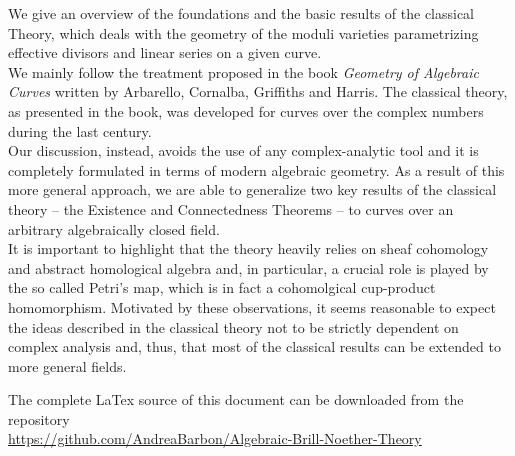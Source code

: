 


\begin{abstracts}         %

	We give an overview of the foundations and the basic results of the classical \BN Theory, which deals with the geometry of the moduli varieties parametrizing effective divisors and linear series on a given curve.\\
	We mainly follow the treatment proposed in the book \emph{Geometry of Algebraic Curves} written by Arbarello, Cornalba, Griffiths and Harris. 
	The classical theory, as presented in the book, was developed for curves over the complex numbers during the last century.\\ 
	Our discussion, instead, avoids the use of any complex-analytic tool and it is completely formulated in terms of modern algebraic geometry. As a result of this more general approach, we are able to generalize two key results of the classical theory -- the Existence and Connectedness Theorems -- to curves over an arbitrary algebraically closed field.\\
	It is important to highlight that the \BN theory heavily relies on sheaf cohomology and abstract homological algebra and, in particular, a crucial role is played by the so called Petri's map, which is in fact a cohomolgical cup-product homomorphism. Motivated by these observations, it seems reasonable to expect the ideas described in the classical theory not to be strictly dependent on complex analysis and, thus, that most of the classical results can be extended to more general fields.
	\vspace{10em}
	\begin{center}
		\footnotesize{
			The complete LaTex source of this document can be downloaded from the repository \\ 
			\href{https://github.com/AndreaBarbon/Algebraic-Brill-Noether-Theory}{https://github.com/AndreaBarbon/Algebraic-Brill-Noether-Theory}
		}
	\end{center}

\end{abstracts}


